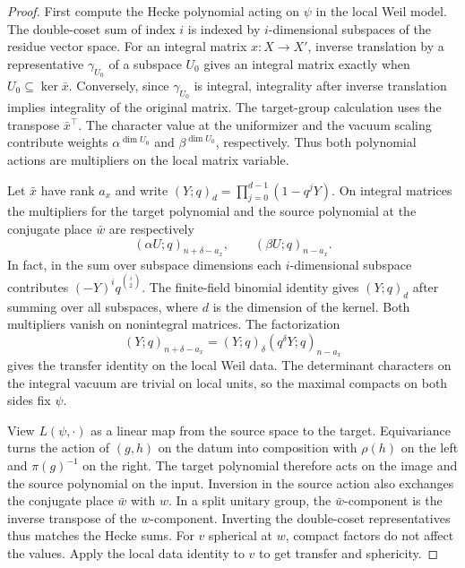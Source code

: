 \begin{proof}
First compute the Hecke polynomial acting on $\psi$ in the local Weil model. The double-coset sum of index $i$ is indexed by $i$-dimensional subspaces of the residue vector space. For an integral matrix $x:X\to X'$, inverse translation by a representative $\gamma_{U_0}$ of a subspace $U_0$ gives an integral matrix exactly when $U_0\subseteq\ker\bar x$. Conversely, since $\gamma_{U_0}$ is integral, integrality after inverse translation implies integrality of the original matrix. The target-group calculation uses the transpose $\bar x^\top$. The character value at the uniformizer and the vacuum scaling contribute weights $\alpha^{\dim U_0}$ and $\beta^{\dim U_0}$, respectively. Thus both polynomial actions are multipliers on the local matrix variable.

Let $\bar x$ have rank $a_x$ and write $(Y;q)_d=\prod_{j=0}^{d-1}(1-q^jY)$. On integral matrices the multipliers for the target polynomial and the source polynomial at the conjugate place $\bar w$ are respectively
\[
 (\alpha U;q)_{n+\delta-a_x},\qquad
 (\beta U;q)_{n-a_x}.
\]
In fact, in the sum over subspace dimensions each $i$-dimensional subspace contributes $(-Y)^i q^{\binom i2}$. The finite-field binomial identity gives $(Y;q)_d$ after summing over all subspaces, where $d$ is the dimension of the kernel. Both multipliers vanish on nonintegral matrices. The factorization
\[
 (Y;q)_{n+\delta-a_x}
   =(Y;q)_\delta(q^\delta Y;q)_{n-a_x}
\]
gives the transfer identity on the local Weil data. The determinant characters on the integral vacuum are trivial on local units, so the maximal compacts on both sides fix $\psi$.

View $L(\psi,\cdot)$ as a linear map from the source space to the target. Equivariance turns the action of $(g,h)$ on the datum into composition with $\rho(h)$ on the left and $\pi(g)^{-1}$ on the right. The target polynomial therefore acts on the image and the source polynomial on the input. Inversion in the source action also exchanges the conjugate place $\bar w$ with $w$. In a split unitary group, the $\bar w$-component is the inverse transpose of the $w$-component. Inverting the double-coset representatives thus matches the Hecke sums. For $v$ spherical at $w$, compact factors do not affect the values. Apply the local data identity to $v$ to get transfer and sphericity.
\end{proof}

